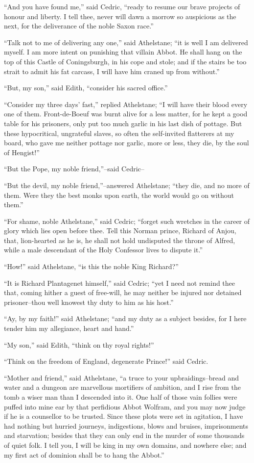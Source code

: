 ``And you have found me,'' said Cedric, ``ready to resume our brave
projects of honour and liberty. I tell thee, never will dawn a morrow so
auspicious as the next, for the deliverance of the noble Saxon race.''

``Talk not to me of delivering any one,'' said Athelstane; ``it is well
I am delivered myself. I am more intent on punishing that villain Abbot.
He shall hang on the top of this Castle of Coningsburgh, in his cope and
stole; and if the stairs be too strait to admit his fat carcass, I will
have him craned up from without.''

``But, my son,'' said Edith, ``consider his sacred office.''

``Consider my three days' fast,'' replied Athelstane; ``I will have
their blood every one of them. Front-de-Boeuf was burnt alive for a less
matter, for he kept a good table for his prisoners, only put too much
garlic in his last dish of pottage. But these hypocritical, ungrateful
slaves, so often the self-invited flatterers at my board, who gave me
neither pottage nor garlic, more or less, they die, by the soul of
Hengist!''

``But the Pope, my noble friend,''--said Cedric--

``But the devil, my noble friend,''--answered Athelstane; ``they die,
and no more of them. Were they the best monks upon earth, the world
would go on without them.''

``For shame, noble Athelstane,'' said Cedric; ``forget such wretches in
the career of glory which lies open before thee. Tell this Norman
prince, Richard of Anjou, that, lion-hearted as he is, he shall not hold
undisputed the throne of Alfred, while a male descendant of the Holy
Confessor lives to dispute it.''

``How!'' said Athelstane, ``is this the noble King Richard?''

``It is Richard Plantagenet himself,'' said Cedric; ``yet I need not
remind thee that, coming hither a guest of free-will, he may neither be
injured nor detained prisoner--thou well knowest thy duty to him as his
host.''

``Ay, by my faith!'' said Athelstane; ``and my duty as a subject
besides, for I here tender him my allegiance, heart and hand.''

``My son,'' said Edith, ``think on thy royal rights!''

``Think on the freedom of England, degenerate Prince!'' said Cedric.

``Mother and friend,'' said Athelstane, ``a truce to your
upbraidings--bread and water and a dungeon are marvellous mortifiers of
ambition, and I rise from the tomb a wiser man than I descended into it.
One half of those vain follies were puffed into mine ear by that
perfidious Abbot Wolfram, and you may now judge if he is a counsellor to
be trusted. Since these plots were set in agitation, I have had nothing
but hurried journeys, indigestions, blows and bruises, imprisonments and
starvation; besides that they can only end in the murder of some
thousands of quiet folk. I tell you, I will be king in my own domains,
and nowhere else; and my first act of dominion shall be to hang the
Abbot.''

